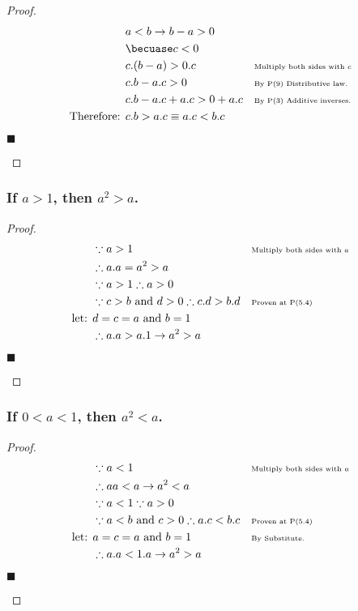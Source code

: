 \documentclass[letterpaper, 10 pt, conference]{ieeeconf}  %
\begin{document}
\begin{proof}
\begin{align}
    &a < b \rightarrow b - a > 0 &&\\
    &\becuase c < 0 && \\
    & c.(b - a) > 0.c && \text{\tiny{Multiply both sides with $c$}} \\
    & c.b - a.c > 0 && \text{\tiny{By P(9) Distributive law.}}\\
    & c.b - a.c + a.c > 0 + a.c && \text{\tiny{By P(3) Additive inverses.}}\\
    \text{Therefore: }& c.b > a.c \equiv a.c < b.c &&
\end{align}
\begin{flushright}
$\blacksquare$
\end{flushright}
\end{proof}

\subsubsection{\textbf{If $a > 1$, then $a^2 > a$.}}

\begin{proof}
\begin{align}
    &\because a > 1 && \text{\tiny{Multiply both sides with $a$}} \\
    &\therefore a.a = a^2 > a &&\\
    &\because a > 1 \therefore a > 0 &&  \\
    &\because c > b \text{ and }  d > 0 \therefore c.d > b.d && \text{\tiny{Proven at P(5.4)}} \\
    \text{let: } & d = c = a \text{ and } b = 1 && \\
    & \therefore a.a > a.1 \rightarrow a^2 > a&&
\end{align}
\begin{flushright}
$\blacksquare$
\end{flushright}
\end{proof}

\subsubsection{\textbf{If $0 < a < 1$, then $a^2 < a$.}}

\begin{proof}
\begin{align}
    &\because a < 1 && \text{\tiny{Multiply both sides with $a$}}\\
    &\therefore aa < a \rightarrow a^2 < a &&\\
    &\because a < 1 \because a > 0 &&  \\
    &\because a < b \text{ and }  c > 0 \therefore a.c < b.c && \text{\tiny{Proven at P(5.4)}} \\
    \text{let: } & a = c = a \text{ and } b = 1 && \text{\tiny{By Substitute}.}\\
    & \therefore a.a < 1.a \rightarrow a^2 > a&&
\end{align}
\begin{flushright}
$\blacksquare$
\end{flushright}
\end{proof}
\end{document}
